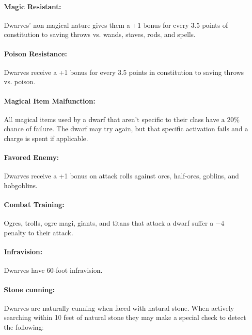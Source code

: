 \begin{multicols}{2}

\paragraph{Magic Resistant:} Dwarves' non-magical nature gives them a +1 bonus for every 3.5 points of constitution to saving throws vs. wands, staves, rods, and spells.

\paragraph{Poison Resistance:} Dwarves receive a +1 bonus for every 3.5 points in constitution to saving throws vs. poison.

\paragraph{Magical Item Malfunction:} All magical items used by a dwarf that aren't specific to their class have a 20\% chance of failure.  The dwarf may try again, but that specific activation fails and a charge is spent if applicable.

\paragraph{Favored Enemy:} Dwarves receive a +1 bonus on attack rolls against orcs, half-orcs, goblins, and hobgoblins.  

\paragraph{Combat Training:} Ogres, trolls, ogre magi, giants, and titans that attack a dwarf suffer a $-4$ penalty to their attack.  
 
\paragraph{Infravision:} Dwarves have 60-foot infravision.

\paragraph{Stone cunning:} Dwarves are naturally cunning when faced with natural stone.  When actively searching within 10 feet of natural stone they may make a special check to detect the following:


\end{multicols}
